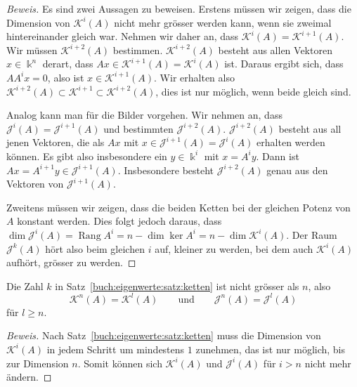 \begin{proof}[Beweis]
Es sind zwei Aussagen zu beweisen.
Erstens müssen wir zeigen, dass die Dimension von $\mathcal{K}^i(A)$ 
nicht mehr grösser werden kann, wenn sie zweimal hintereinander gleich war.
Nehmen wir daher an, dass $\mathcal{K}^i(A) = \mathcal{K}^{i+1}(A)$.
Wir müssen $\mathcal{K}^{i+2}(A)$ bestimmen.
$\mathcal{K}^{i+2}(A)$ besteht aus allen Vektoren $x\in\Bbbk^n$ derart,
dass $Ax\in \mathcal{K}^{i+1}(A)=\mathcal{K}^i(A)$ ist.
Daraus ergibt sich, dass $AA^ix=0$, also ist $x\in\mathcal{K}^{i+1}(A)$.
Wir erhalten also
$\mathcal{K}^{i+2}(A)\subset\mathcal{K}^{i+1}\subset\mathcal{K}^{i+2}(A)$,
dies ist nur möglich, wenn beide gleich sind.

Analog kann man für die Bilder vorgehen.
Wir nehmen an, dass $\mathcal{J}^i(A) = \mathcal{J}^{i+1}(A)$ und
bestimmten $\mathcal{J}^{i+2}(A)$.
$\mathcal{J}^{i+2}(A)$ besteht aus all jenen Vektoren, die als
$Ax$ mit $x\in\mathcal{J}^{i+1}(A)=\mathcal{J}^i(A)$ erhalten
werden können.
Es gibt also insbesondere ein $y\in\Bbbk^i$ mit $x=A^iy$.
Dann ist $Ax=A^{i+1}y\in\mathcal{J}^{i+1}(A)$.
Insbesondere besteht $\mathcal{J}^{i+2}(A)$ genau aus den Vektoren
von $\mathcal{J}^{i+1}(A)$.

Zweitens müssen wir zeigen, dass die beiden Ketten bei der gleichen
Potenz von $A$ konstant werden.
Dies folgt jedoch daraus, dass $\dim\mathcal{J}^i(A) = \operatorname{Rang} A^i
= n - \dim\ker A^i = n -\dim\mathcal{K}^i(A)$.
Der Raum $\mathcal{J}^k(A)$ hört also beim gleichen $i$ auf, kleiner
zu werden, bei dem auch $\mathcal{K}^i(A)$ aufhört, grösser zu werden.
\end{proof}

\begin{satz}
Die Zahl $k$ in Satz~\ref{buch:eigenwerte:satz:ketten}
ist nicht grösser als $n$, also
\[
\mathcal{K}^n(A) = \mathcal{K}^l(A)
\qquad\text{und}\qquad
\mathcal{J}^n(A) = \mathcal{J}^l(A)
\]
für $l\ge n$.
\end{satz}

\begin{proof}[Beweis]
Nach Satz~\ref{buch:eigenwerte:satz:ketten} muss die
Dimension von $\mathcal{K}^i(A)$ in jedem Schritt um mindestens
$1$ zunehmen, das ist nur möglich, bis zur Dimension $n$.
Somit können sich $\mathcal{K}^i(A)$ und $\mathcal{J}^i(A)$ für $i>n$
nicht mehr ändern.
\end{proof}

